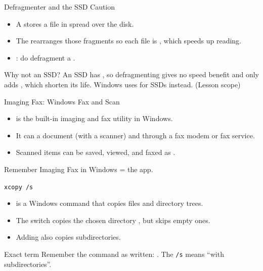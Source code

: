 \documentclass[aspectratio=169]{beamer}
\begin{document}
\begin{frame}{Defragmenter and the SSD Caution}
  \begin{itemize}
    \item A  stores a file in
       spread over the disk.
    \item The  rearranges those fragments so each file
      is , which speeds up reading.
    \item {}: do  defragment a .
  \end{itemize}
  \begin{alertblock}{Why not an SSD?}
    An SSD has , so defragmenting gives no speed benefit
    and only adds , which shorten its life. Windows uses
     for SSDs instead. (Lesson scope)
  \end{alertblock}
\end{frame}

\begin{frame}{Imaging Fax: Windows Fax and Scan}
  \begin{itemize}
    \item {} is the built-in imaging and fax utility
      in Windows.
    \item It can  a document (with a scanner) and
       through a fax modem or fax service.
    \item Scanned items can be saved, viewed, and faxed as .
  \end{itemize}
  \begin{block}{Remember}
    Imaging Fax in Windows = the  app.
  \end{block}
\end{frame}

\begin{frame}{\texttt{xcopy /s}}
  \begin{itemize}
    \item {} is a Windows  command that copies
      files and directory trees.
    \item The switch  copies the chosen directory
      , but skips empty ones.
    \item Adding  also copies  subdirectories.
  \end{itemize}
  \begin{alertblock}{Exact term}
    Remember the command as written: . The \texttt{/s}
    means ``with subdirectories''.
  \end{alertblock}
\end{frame}
\end{document}
